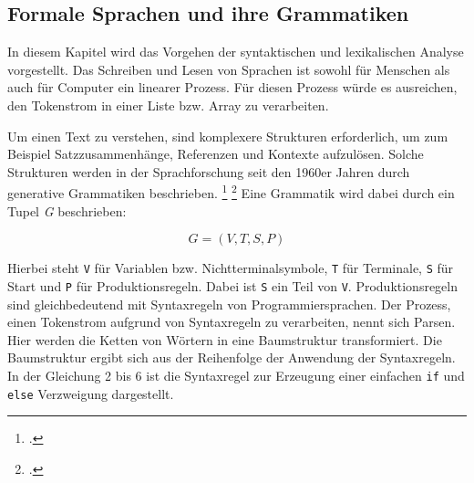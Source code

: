 



\pagebreak
   
   
\subsection{Formale Sprachen und ihre Grammatiken}
% 
In diesem Kapitel wird das Vorgehen der syntaktischen und lexikalischen Analyse vorgestellt. Das Schreiben und Lesen von Sprachen ist sowohl für Menschen als auch für Computer ein linearer Prozess. Für diesen Prozess würde es ausreichen, den Tokenstrom in einer Liste bzw. Array zu verarbeiten.

Um einen Text zu verstehen, sind komplexere Strukturen erforderlich, um zum Beispiel Satzzusammenhänge, Referenzen und Kontexte aufzulösen. Solche Strukturen werden in der Sprachforschung seit den 1960er Jahren durch generative Grammatiken beschrieben. \footcite[Vgl. ][S. 117]{choms} \footcite[Vgl. ][S. 149ff. ]{automata}
Eine Grammatik wird dabei durch ein Tupel \emph{G} beschrieben:

\begin{center}
	\begin{equation}\label{eqn:grammar}
		G=(V,T,S,P)
	\end{equation}
\end{center}


Hierbei steht \verb+V+ für Variablen bzw. Nichtterminalsymbole, \verb+T+ für Terminale, \verb+S+ für Start und \verb+P+ für Produktionsregeln. Dabei ist \verb+S+ ein Teil von \verb+V+. Produktionsregeln sind gleichbedeutend mit Syntaxregeln von Programmiersprachen. 
Der Prozess, einen Tokenstrom aufgrund von Syntaxregeln zu verarbeiten, nennt sich Parsen.
Hier werden die Ketten von Wörtern in eine Baumstruktur transformiert.
Die Baumstruktur ergibt sich aus der Reihenfolge der Anwendung der Syntaxregeln. In der Gleichung 2 bis 6 ist die Syntaxregel zur Erzeugung einer einfachen \verb+if+ und \verb+else+ Verzweigung dargestellt.

